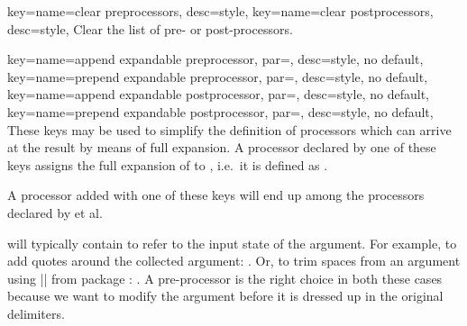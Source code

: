 \documentclass[a4paper,11pt]{article}
\begin{document}
\begin{doc}[
    pi={\docaux{cmd}{collargsClearPreprocessors},
      \docaux{cmd}{collargsClearPostprocessors}},
  ]{
    key={name=clear preprocessors}, desc=style,
    key={name=clear postprocessors}, desc=style,
  }
  Clear the list of pre- or post-processors.
\end{doc}

\begin{doc}[
    pi={\docaux{cmd}{collargsAppendExpandablePreprocessor},
      \docaux{cmd}{collargsPrependExpandablePreprocessor},
      \docaux{cmd}{collargsAppendExpandablePostprocessor},
      \docaux{cmd}{collargsPrependExpandablePostprocessor}
    },
  ]{
    key={name=append expandable preprocessor, par=, desc={style, no default}},
    key={name=prepend expandable preprocessor, par=, desc={style, no default}},
    key={name=append expandable postprocessor, par=, desc={style, no default}},
    key={name=prepend expandable postprocessor, par=, desc={style, no default}},
  }
  These keys may be used to simplify the definition of processors which can
  arrive at the result by means of full expansion.  A processor declared by one
  of these keys assigns the full expansion of  to
  , i.e.\ it is defined as
  .

  A processor added with one of these keys will end up among the processors
  declared by  et al.

   will typically contain  to
  refer to the input state of the argument.  For example, to add quotes around
  the collected argument: .  Or, to trim spaces from an
  argument using |\trim@spaces@noexp| from package :
  .  A pre-processor is the right choice in
  both these cases because we want to modify the argument before it is dressed
  up in the original delimiters.


\end{doc}
\end{document}
